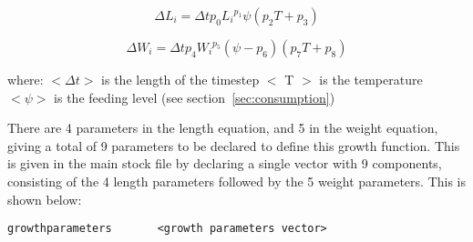 \documentclass [a4paper, 10pt]{book}
\begin{document}
\begin{equation}\label{eq:growth1l}
\Delta L_{i} = \Delta t p_{0} {L_{i}}^{p_{1}} \psi (p_{2} T + p_{3})
\end{equation}

\begin{equation}\label{eq:growth1w}
\Delta W_{i} = \Delta t p_{4} {W_{i}}^{p_{5}} (\psi - p_{6}) (p_{7} T + p_{8})
\end{equation}

where:\newline
$<\Delta t>$ is the length of the timestep\newline
$<$ T $>$ is the temperature\newline
$<\psi>$ is the feeding level (see section~\ref{sec:consumption})

\bigskip
There are 4 parameters in the length equation, and 5 in the weight equation, giving a total of 9 parameters to be declared to define this growth function.  This is given in the main stock file by declaring a single vector with 9 components, consisting of the 4 length parameters followed by the 5 weight parameters.  This is shown below:

{\small\begin{verbatim}
growthparameters       <growth parameters vector>
\end{verbatim}}

%
%
%
\end{document}
